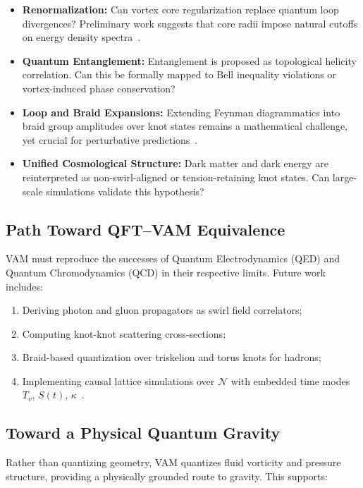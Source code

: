 \documentclass[preprint]{revtex4-2}
\begin{document}
    \begin{itemize}
        \item \textbf{Renormalization:} Can vortex core regularization replace quantum loop divergences? Preliminary work suggests that core radii impose natural cutoffs on energy density spectra~\cite{kleckner2013knots, moffatt1969knottedness}.
        \item \textbf{Quantum Entanglement:} Entanglement is proposed as topological helicity correlation. Can this be formally mapped to Bell inequality violations or vortex-induced phase conservation?
        \item \textbf{Loop and Braid Expansions:} Extending Feynman diagrammatics into braid group amplitudes over knot states remains a mathematical challenge, yet crucial for perturbative predictions~\cite{kleckner2013knots}.
        \item \textbf{Unified Cosmological Structure:} Dark matter and dark energy are reinterpreted as non-swirl-aligned or tension-retaining knot states. Can large-scale simulations validate this hypothesis?~\cite{verlinde2011origin}
    \end{itemize}

    \subsection*{Path Toward QFT–VAM Equivalence}
    VAM must reproduce the successes of Quantum Electrodynamics (QED) and Quantum Chromodynamics (QCD) in their respective limits. Future work includes:

    \begin{enumerate}
        \item Deriving photon and gluon propagators as swirl field correlators;
        \item Computing knot-knot scattering cross-sections;
        \item Braid-based quantization over triskelion and torus knots for hadrons;
        \item Implementing causal lattice simulations over $\mathcal{N}$ with embedded time modes $T_v$, $S(t)$, $\kappa$~\cite{moffatt1969knottedness}.
    \end{enumerate}

    \subsection*{Toward a Physical Quantum Gravity}
    Rather than quantizing geometry, VAM quantizes fluid vorticity and pressure structure, providing a physically grounded route to gravity. This supports:
\end{document}
